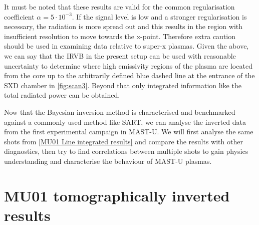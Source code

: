 It must be noted that these results are valid for the common regularisation coefficient $\alpha=5 \cdot 10^{-3}$. If the signal level is low and a stronger regularisation is necessary, the radiation is more spread out and this results in the region with insufficient resolution to move towards the x-point. Therefore extra caution should be used in examining data relative to super-x plasmas.
Given the above, we can say that the IRVB in the present setup can be used with reasonable uncertainty to determine where high emissivity regions of the plasma are located from the core up to the arbitrarily defined blue dashed line at the entrance of the SXD chamber in \autoref{fig:scan3}. Beyond that only integrated information like the total radiated power can be obtained.


Now that the Bayesian inversion method is characterised and benchmarked against a commonly used method like SART, we can analyse the inverted data from the first experimental campaign in MAST-U. We will first analyse the same shots from \autoref{MU01 Line integrated results} and compare the results with other diagnostics, then try to find correlations between multiple shots to gain physics understanding and characterise the behaviour of MAST-U plasmas.

\section{MU01 tomographically inverted results}\label{MU01 tomographycally inverted results}

